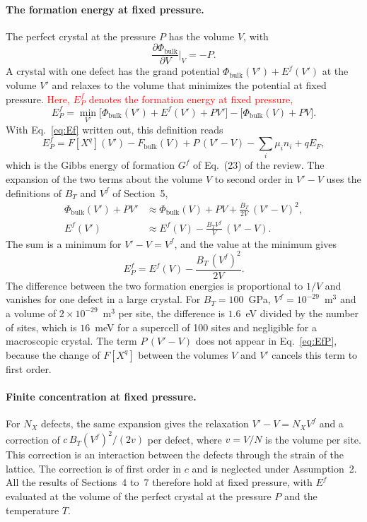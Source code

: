 \documentclass[11pt]{article}      %
\numberwithin{equation}{section}   %
\begin{document}
\paragraph{The formation energy at fixed pressure.}
The perfect crystal at the pressure $P$ has the volume $V$, with
\begin{equation*}
    \frac{\partial\Phi_{\text{bulk}}}{\partial V}\bigg|_{V}=-P.
\end{equation*}
A crystal with one defect has the grand potential
$\Phi_{\text{bulk}}(V')+E^f(V')$ at the volume $V'$ and relaxes to the
volume that minimizes the potential at fixed pressure.
\textcolor{red}{Here, $E^f_P$ denotes the formation energy at fixed
pressure,}
\begin{equation*}
    E^f_P=\min_{V'}\Big[\Phi_{\text{bulk}}(V')+E^f(V')+PV'\Big]
    -\Big[\Phi_{\text{bulk}}(V)+PV\Big].
\end{equation*}
With Eq.~\eqref{eq:Ef} written out, this definition reads
\begin{equation*}
    E^f_P=F[X^q](V')-F_{\text{bulk}}(V)+P\,(V'-V)-\sum_i\mu_in_i+qE_F,
\end{equation*}
which is the Gibbs energy of formation $G^f$ of Eq.~(23) of the review. The
expansion of the two terms about the volume $V$ to second order in $V'-V$
uses the definitions of $B_T$ and $V^f$ of Section~5,
\begin{align*}
    \Phi_{\text{bulk}}(V')+PV'
    &\approx\Phi_{\text{bulk}}(V)+PV+\frac{B_T}{2V}\,(V'-V)^2,\\
    E^f(V')&\approx E^f(V)-\frac{B_TV^f}{V}\,(V'-V).
\end{align*}
The sum is a minimum for $V'-V=V^f$, and the value at the minimum gives
\begin{equation}
    \boxed{E^f_P=E^f(V)-\frac{B_T\,(V^f)^2}{2V}.}
    \label{eq:EfP}
\end{equation}
The difference between the two formation energies is proportional to $1/V$
and vanishes for one defect in a large crystal. For $B_T=100$~GPa,
$V^f=10^{-29}$~m$^3$ and a volume of $2\times10^{-29}$~m$^3$ per site, the
difference is $1.6$~eV divided by the number of sites, which is $16$~meV for
a supercell of 100 sites and negligible for a macroscopic crystal. The term
$P\,(V'-V)$ does not appear in Eq.~\eqref{eq:EfP}, because the change of
$F[X^q]$ between the volumes $V$ and $V'$ cancels this term to first order.

\paragraph{Finite concentration at fixed pressure.}
For $N_X$ defects, the same expansion gives the relaxation $V'-V=N_XV^f$ and
a correction of $c\,B_T(V^f)^2/(2v)$ per defect, where $v=V/N$ is the volume
per site. This correction is an interaction between the defects through the
strain of the lattice. The correction is of first order in $c$ and is
neglected under Assumption~2. All the results of Sections~4 to~7 therefore
hold at fixed pressure, with $E^f$ evaluated at the volume of the perfect
crystal at the pressure $P$ and the temperature $T$.
\end{document}
